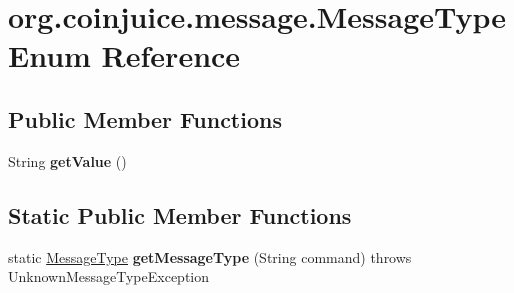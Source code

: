 \hypertarget{enumorg_1_1coinjuice_1_1message_1_1_message_type}{\section{org.\-coinjuice.\-message.\-Message\-Type Enum Reference}
\label{enumorg_1_1coinjuice_1_1message_1_1_message_type}
}
\subsection*{Public Member Functions}
\begin{DoxyCompactItemize}
\item 
\hypertarget{enumorg_1_1coinjuice_1_1message_1_1_message_type_aa70eaf4dbfbf76a9450a97fe194c9292}{String {\bfseries get\-Value} ()}\label{enumorg_1_1coinjuice_1_1message_1_1_message_type_aa70eaf4dbfbf76a9450a97fe194c9292}

\end{DoxyCompactItemize}
\subsection*{Static Public Member Functions}
\begin{DoxyCompactItemize}
\item 
\hypertarget{enumorg_1_1coinjuice_1_1message_1_1_message_type_a1bcd3d78bb2727ee1f1a13bf92762d32}{static \hyperlink{enumorg_1_1coinjuice_1_1message_1_1_message_type}{Message\-Type} {\bfseries get\-Message\-Type} (String command)  throws Unknown\-Message\-Type\-Exception }\label{enumorg_1_1coinjuice_1_1message_1_1_message_type_a1bcd3d78bb2727ee1f1a13bf92762d32}

\end{DoxyCompactItemize}
